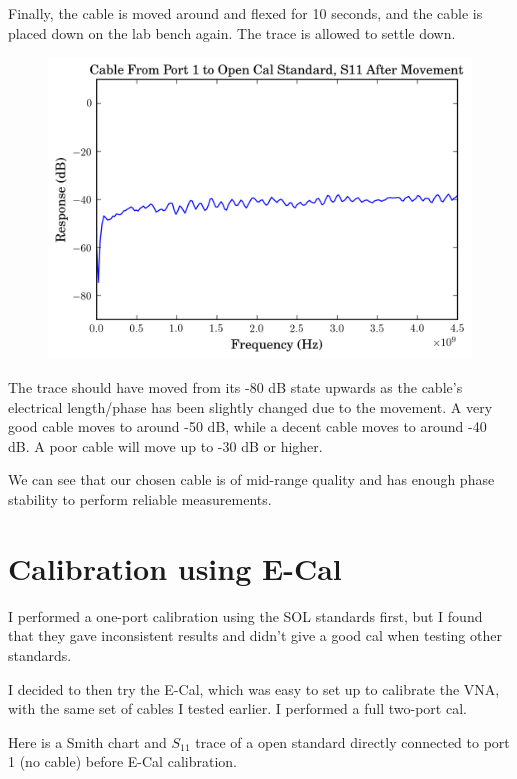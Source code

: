 \documentclass[11pt]{article}
\begin{document}
Finally, the cable is moved around and flexed for 10 seconds, and the cable is placed down on the lab bench again. The trace is allowed to settle down.

\begin{figure}[H]
	\centering \includegraphics[width=\linewidth-6cm]{images/one_port_s11_open_cal_after_movement.png}
\end{figure}

The trace should have moved from its -80 dB state upwards as the cable's electrical length/phase has been slightly changed due to the movement. A very good cable moves to around -50 dB, while a decent cable moves to around -40 dB. A poor cable will move up to -30 dB or higher.

We can see that our chosen cable is of mid-range quality and has enough phase stability to perform reliable measurements.

\section{Calibration using E-Cal}

I performed a one-port calibration using the SOL standards first, but I found that they gave inconsistent results and didn't give a good cal when testing other standards.

I decided to then try the E-Cal, which was easy to set up to calibrate the VNA, with the same set of cables I tested earlier. I performed a full two-port cal.

Here is a Smith chart and $S_{11}$ trace of a open standard directly connected to port 1 (no cable) before E-Cal calibration.
\end{document}
